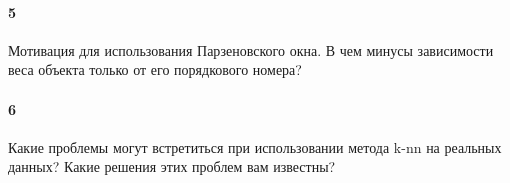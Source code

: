 \documentclass[a4paper,12pt]{article}
\begin{document}
  \paragraph{5} Мотивация для использования Парзеновского окна. В чем минусы зависимости веса
объекта только от его порядкового номера?\\

  \makebox[\linewidth]{\hrulefill}
  \makebox[\linewidth]{\hrulefill}
  
  \paragraph{6} Какие проблемы могут встретиться при использовании метода k-nn на реальных
данных? Какие решения этих проблем вам известны?\\

  \makebox[\linewidth]{\hrulefill}
  \makebox[\linewidth]{\hrulefill}
  \makebox[\linewidth]{\hrulefill}
\end{document}
